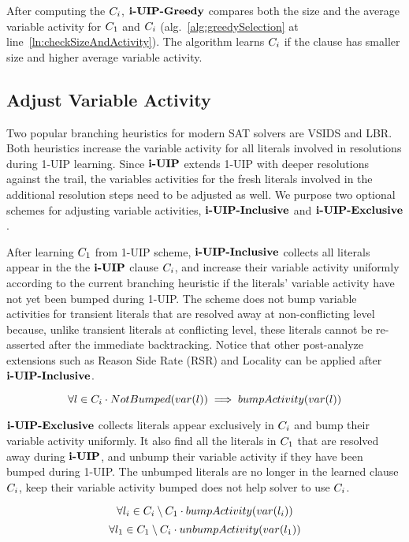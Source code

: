 After computing the $C_{i}$, $\textbf{i-UIP-Greedy}$ compares both the size and the average variable activity for $C_{1}$ and $C_{i}$ (alg.~\ref{alg:greedySelection} at line~\ref{ln:checkSizeAndActivity}). The algorithm learns $C_{i}$ if the clause has smaller size and higher average variable activity. 

\subsection{Adjust Variable Activity} \label{sec: varajust}
Two popular branching heuristics for modern SAT solvers are VSIDS and LBR. Both heuristics increase 
the variable activity for all literals involved in resolutions during 1-UIP learning. Since $\textbf{i-UIP}$ extends 1-UIP with deeper resolutions against the trail, the variables activities for the fresh literals involved in the additional resolution steps need to be adjusted as well. We purpose two optional schemes for adjusting variable activities, $\textbf{i-UIP-Inclusive}$ and $\textbf{i-UIP-Exclusive}$. 

After learning $C_{1}$ from 1-UIP scheme, $\textbf{i-UIP-Inclusive}$ collects all literals appear  in the the $\textbf{i-UIP}$ clause $C_{i}$, and increase their variable activity uniformly according to the current branching heuristic if the literals' variable activity have not yet been bumped during 1-UIP. The scheme does not bump variable activities for transient literals that are resolved away at non-conflicting level because, unlike transient literals at conflicting level, these literals cannot be re-asserted after the immediate backtracking. Notice that other post-analyze extensions such as Reason Side Rate (RSR) and Locality\cite{} can be applied after $\textbf{i-UIP-Inclusive}$.

\[ \forall l \in  C_{i} \cdot NotBumped(var(l)) \implies  bumpActivity(var(l)) \]

$\textbf{i-UIP-Exclusive}$ collects literals appear exclusively in $C_{i}$ and bump their variable activity uniformly. It also find all the literals in $C_{1}$ that are resolved away during $\textbf{i-UIP}$, and unbump their variable activity if they have been bumped during 1-UIP. The unbumped literals are no longer in the learned clause $C_{i}$, keep their variable activity bumped does not help solver to use $C_{i}$.

\[ \forall l_{i} \in  C_{i} \setminus C_{1} \cdot bumpActivity(var(l_{i})) 
\]
\[ \forall l_{1} \in  C_{1} \setminus C_{i} \cdot unbumpActivity(var(l_{1})) 
\]


